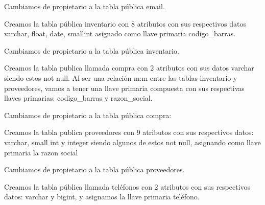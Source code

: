 \documentclass[letterpaper,12pt]{article}
\begin{document}
	
	
	Cambiamos de propietario a la tabla pública email.
	
	
	
	Creamos la tabla pública inventario con 8 atributos con sus respectivos datos varchar, float, date, smallint asignado como llave primaria codigo\_barras.
	
	
	
	Cambiamos de propietario a la tabla pública inventario.
	
	
	
	Creamos la tabla publica llamada compra con 2 atributos con sus datos varchar siendo estos not null.
	Al ser una relación m:m entre las tablas inventario y proveedores, vamos a tener una llave primaria compuesta con sus respectivas llaves primarias: codigo\_barras y razon\_social.
	
	
	
	Cambiamos de propietario a la tabla pública compra:
	
	
	
	Creamos la tabla publica proveedores con 9 atributos con sus respectivos datos: varchar, small int y integer siendo algunos de estos not null, asignando como llave primaria la razon social
	
	
	
	Cambiamos de propietario a la tabla pública proveedores.
	
	
	
	Creamos la tabla pública llamada teléfonos con 2 atributos con sus respectivos datos: varchar y bigint, y asignamos la llave primaria teléfono.
	
	
	
\end{document}

